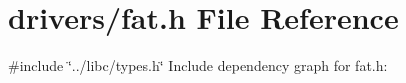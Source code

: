 \hypertarget{a00002}{}\section{drivers/fat.h File Reference}
\label{a00002}
{\ttfamily \#include \char`\"{}../libc/types.\+h\char`\"{}}\newline
Include dependency graph for fat.\+h\+:
